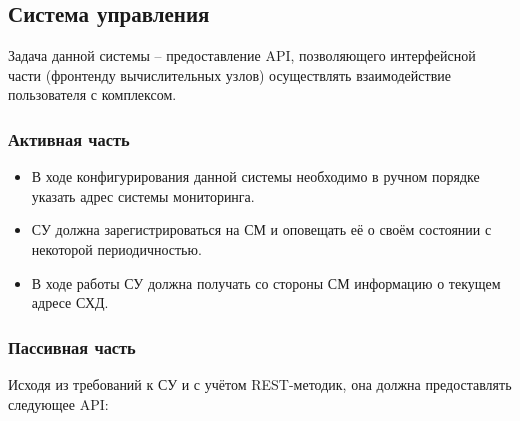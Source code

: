 \documentclass[a4paper,12pt]{report}
\numberwithin{equation}{section}
\begin{document}
  \subsection{Система управления}
  Задача данной системы -- предоставление API, позволяющего интерфейсной части (фронтенду вычислительных узлов) осуществлять взаимодействие пользователя с комплексом.
  
  \subsubsection{Активная часть}
  \begin{itemize}
    \item В ходе конфигурирования данной системы необходимо в ручном порядке указать адрес системы мониторинга.
    \item СУ должна зарегистрироваться на СМ и оповещать её о своём состоянии с некоторой периодичностью.
    \item В ходе работы СУ должна получать со стороны СМ информацию о текущем адресе СХД.
  \end{itemize}
  
  \subsubsection{Пассивная часть}
  Исходя из требований к СУ и с учётом REST-методик, она должна предоставлять следующее API:
  
\end{document}
